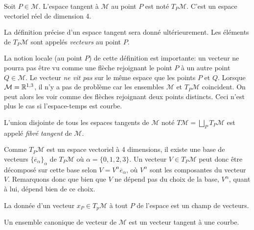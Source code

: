 \begin{theoremframe}
    \begin{notat}
    Soit $P\in \mathcal{M}$. L'espace tangent à $\mathcal{M}$ au point $P$ est noté $T_P\mathcal{M}$. C'est un espace vectoriel réel de dimension 4.
    \end{notat}
\end{theoremframe}
La définition précise d'un espace tangent sera donné ultérieurement. Les éléments de $T_P\mathcal{M}$ sont appelés \textit{vecteurs} au point $P$. 
\begin{rmk}
La notion locale (au point $P$) de cette définition est importante: un vecteur ne pourra pas être vu comme une flèche rejoignant le point $P$ à un autre point $Q \in \mathcal{M}$. Le vecteur \textit{ne vit pas} sur le même espace que les points $P$ et $Q$. Lorsque $\mathcal{M} = \mathbb{R}^{1,3}$, il n'y a pas de problème car les ensembles $\mathcal{M}$ et $T_P\mathcal{M}$ coincident. On peut alors les voir comme des flèches rejoignant deux points distincts. Ceci n'est plus le cas si l'espace-temps est courbe.
\end{rmk}
\begin{theoremframe}
\begin{defi}
    L'union disjointe de tous les espaces tangents de $\mathcal{M}$ noté $T\mathcal{M}=\bigsqcup_P T_P\mathcal{M}$ est appelé \textit{fibré tangent} de $\mathcal{M}$.
\end{defi}
\end{theoremframe}
Comme $T_P\mathcal{M}$ est un espace vectoriel à 4 dimensions, il existe une base de vecteurs $\{\overline{e}_\alpha\}_\alpha$ de $T_P\mathcal{M}$ où $\alpha = \{0,1,2,3\}$. Un vecteur $V \in T_P\mathcal{M}$ peut donc être décomposé sur cette base selon $V = V^\alpha \overline{e}_\alpha$, où $V^\alpha$ sont les composantes du vecteur $V$. Remarquons donc que bien que $V$ ne dépend pas du choix de la base, $V^\alpha$, quant à lui, dépend bien de ce choix.

La donnée d'un vecteur $x_{P} \in T_{p}\mathcal{M}$ à tout $P$ de l'espace est un champ de vecteurs.

Un ensemble canonique de vecteur de $\mathcal{M}$ est un vecteur tangent à une courbe. 

